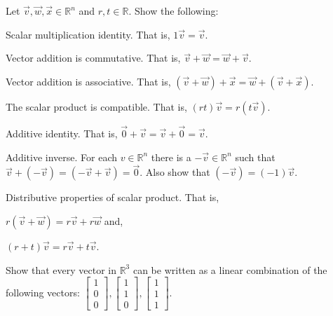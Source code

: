 \begin{exercise}
Let $\vec{v},\vec{w},\vec{x} \in \mathbb{R}^n$ and $r,t \in \mathbb{R}$. Show 
the following:\\
\begin{inparaenum}[a.)]
\item Scalar multiplication identity. That is, $1 \vec{v}=\vec{v}$.\\
\item Vector addition is commutative. That is, 
$\vec{v}+\vec{w}=\vec{w}+\vec{v}$.\\
\item Vector addition is associative. That is, 
$(\vec{v}+\vec{w})+\vec{x}=\vec{w}+(\vec{v}+\vec{x})$.\\
\item The scalar product is compatible. That is, $(rt) \vec{v}=r(t \vec{v})$.\\
\item Additive identity. That is, $\vec{0}+\vec{v}=\vec{v}+\vec{0}=\vec{v}$.\\
\item Additive inverse. For each $v \in \mathbb{R}^n$ there is a $-\vec{v} \in \mathbb{R}^n$ such 
that $\vec{v}+(-\vec{v})=(-\vec{v}+\vec{v})=\vec{0}$. 
Also show that $(-\vec{v})=(-1)\vec{v}$. \\
\item Distributive properties of scalar product. That is, \\
\begin{inparaenum}[i.)]
\indent \item  $r(\vec{v}+\vec{w})=r\vec{v}+r\vec{w}$ and,\\
\indent \item  $(r+t)\vec{v}=r\vec{v}+t\vec{v}$.
\end{inparaenum}
\end{inparaenum} 
\end{exercise}


\begin{exercise}
Show that every vector in $\mathbb{R}^3$ can be written as a linear combination 
of the following vectors: $\begin{bmatrix}1\\ 0 \\ 0\end{bmatrix}, 
\begin{bmatrix}1\\ 1 \\ 0\end{bmatrix},\begin{bmatrix}1\\ 1 \\ 1\end{bmatrix}$.
\end{exercise}



